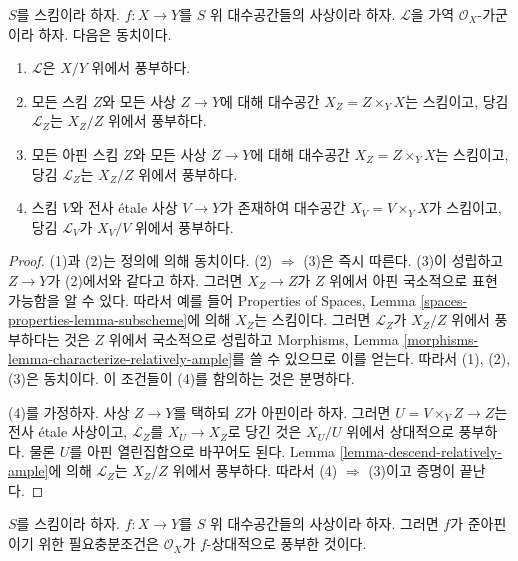 \begin{lemma}
\label{lemma-relatively-ample-local}
$S$를 스킴이라 하자. $f : X \to Y$를 $S$ 위 대수공간들의 사상이라
하자. $\mathcal{L}$을 가역 $\mathcal{O}_X$-가군이라 하자.
다음은 동치이다.
\begin{enumerate}
\item $\mathcal{L}$은 $X/Y$ 위에서 풍부하다.
\item 모든 스킴 $Z$와 모든 사상 $Z \to Y$에 대해 대수공간
$X_Z = Z \times_Y X$는 스킴이고, 당김 $\mathcal{L}_Z$는 $X_Z/Z$
위에서 풍부하다.
\item 모든 아핀 스킴 $Z$와 모든 사상 $Z \to Y$에 대해 대수공간
$X_Z = Z \times_Y X$는 스킴이고, 당김 $\mathcal{L}_Z$는 $X_Z/Z$
위에서 풍부하다.
\item 스킴 $V$와 전사 \'etale 사상 $V \to Y$가 존재하여 대수공간
$X_V = V \times_Y X$가 스킴이고, 당김 $\mathcal{L}_V$가 $X_V/V$
위에서 풍부하다.
\end{enumerate}
\end{lemma}

\begin{proof}
(1)과 (2)는 정의에 의해 동치이다. (2) $\Rightarrow$ (3)은 즉시 따른다.
(3)이 성립하고 $Z \to Y$가 (2)에서와 같다고 하자. 그러면
$X_Z \to Z$가 $Z$ 위에서 아핀 국소적으로 표현 가능함을 알 수 있다.
따라서 예를 들어 Properties of Spaces, Lemma
\ref{spaces-properties-lemma-subscheme}에 의해 $X_Z$는 스킴이다.
그러면 $\mathcal{L}_Z$가 $X_Z/Z$ 위에서 풍부하다는 것은 $Z$ 위에서
국소적으로 성립하고 Morphisms, Lemma
\ref{morphisms-lemma-characterize-relatively-ample}를 쓸 수 있으므로
이를 얻는다. 따라서 (1), (2), (3)은
동치이다. 이 조건들이 (4)를 함의하는 것은 분명하다.

\medskip\noindent
(4)를 가정하자. 사상 $Z \to Y$를 택하되 $Z$가 아핀이라 하자. 그러면
$U = V \times_Y Z \to Z$는 전사 \'etale 사상이고,
$\mathcal{L}_Z$를 $X_U \to X_Z$로 당긴 것은 $X_U/U$ 위에서
상대적으로 풍부하다.
물론 $U$를 아핀 열린집합으로 바꾸어도 된다. Lemma
\ref{lemma-descend-relatively-ample}에 의해 $\mathcal{L}_Z$는 $X_Z/Z$
위에서 풍부하다. 따라서 (4) $\Rightarrow$ (3)이고 증명이 끝난다.
\end{proof}

\begin{lemma}
\label{lemma-quasi-affine-O-ample}
$S$를 스킴이라 하자. $f : X \to Y$를 $S$ 위 대수공간들의 사상이라
하자. 그러면 $f$가 준아핀이기 위한 필요충분조건은
$\mathcal{O}_X$가 $f$-상대적으로 풍부한 것이다.
\end{lemma}

